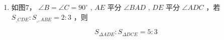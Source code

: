 \begin{enumerate}
\def\labelenumi{\arabic{enumi}.}
\setcounter{enumi}{14}
\tightlist
\item
  如图7， \(\angle B = \angle C = 90 ^ { \circ }\) , \(A E\) 平分
  \(\angle B A D\) , \(D E\) 平分 \(\angle A D C\) ，若
  \(S _ { \_ C D E } : S _ { \_ , A B E } = 2 : 3\) ，则
\end{enumerate}

\[
S _ { \Delta A D E } : S _ { \Delta D C E } = 5 : 3
\]

